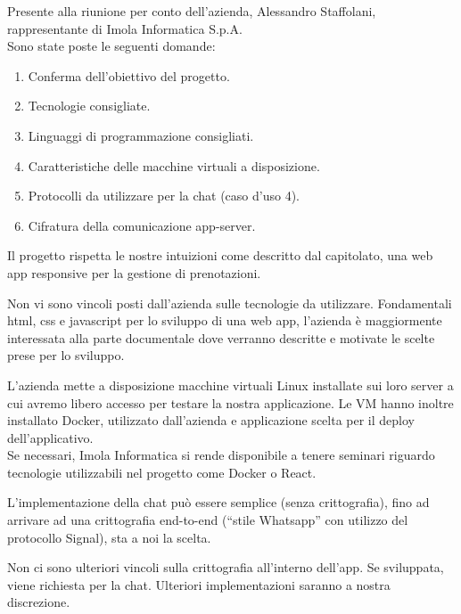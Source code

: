 \documentclass[5pt]{article}
\begin{document}
Presente alla riunione per conto dell’azienda, Alessandro Staffolani, rappresentante di Imola
Informatica S.p.A.\\
Sono state poste le seguenti domande:
\begin{enumerate}
    \item Conferma dell'obiettivo del progetto.
    \item Tecnologie consigliate.
    \item Linguaggi di programmazione consigliati.
    \item Caratteristiche delle macchine virtuali a disposizione.
    \item Protocolli da utilizzare per la chat (caso d’uso 4).
    \item Cifratura della comunicazione app-server.
\end{enumerate}

\vspace{10pt}
Il progetto rispetta le nostre intuizioni come descritto dal capitolato, una web app responsive per la gestione di prenotazioni.

\vspace{10pt}
\noindent Non vi sono vincoli posti dall’azienda sulle tecnologie da utilizzare. Fondamentali html, css e javascript per lo sviluppo di una web app, l’azienda è maggiormente interessata alla parte documentale dove verranno descritte e motivate le scelte prese per lo sviluppo.

\vspace{10pt}
\noindent L’azienda mette a disposizione macchine virtuali Linux installate sui loro server a cui avremo libero accesso per testare la nostra applicazione. Le VM hanno inoltre installato Docker, utilizzato dall’azienda e applicazione scelta per il deploy dell’applicativo.\\
Se necessari, Imola Informatica si rende disponibile a tenere seminari riguardo tecnologie utilizzabili nel progetto come Docker o React.


\vspace{10pt}
\noindent L’implementazione della chat può essere semplice (senza crittografia), fino ad arrivare ad una crittografia end-to-end (“stile Whatsapp” con utilizzo del protocollo Signal), sta a noi la scelta.

\vspace{10pt}
\noindent Non ci sono ulteriori vincoli sulla crittografia all’interno dell’app. Se sviluppata, viene richiesta per la chat. Ulteriori implementazioni saranno a nostra discrezione.

\end{document}
